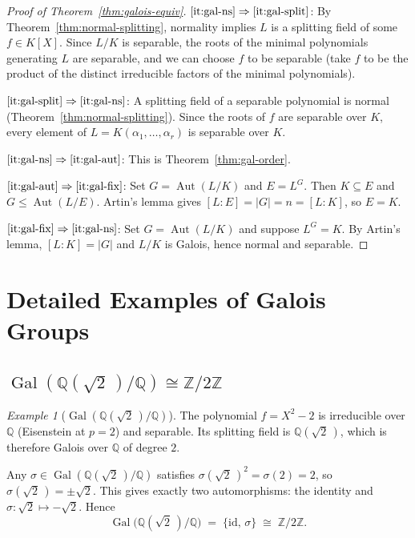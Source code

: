\documentclass[12pt,a4paper,openany]{book}
\theoremstyle{definition}
\theoremstyle{remark}
\newtheorem{example}{Example}[chapter]
\newcommand{\Z}{\mathbb{Z}}
\newcommand{\Q}{\mathbb{Q}}
\DeclareMathOperator{\Gal}{Gal}
\DeclareMathOperator{\Aut}{Aut}
\begin{document}
\begin{proof}[Proof of Theorem~\ref{thm:galois-equiv}]
$\ref{it:gal-ns}\Rightarrow\ref{it:gal-split}$:
By Theorem~\ref{thm:normal-splitting}, normality implies $L$ is a splitting
field of some $f\in K[X]$.  Since $L/K$ is separable, the roots of the
minimal polynomials generating $L$ are separable, and we can choose $f$
to be separable (take $f$ to be the product of the distinct irreducible
factors of the minimal polynomials).

$\ref{it:gal-split}\Rightarrow\ref{it:gal-ns}$:
A splitting field of a separable polynomial is normal
(Theorem~\ref{thm:normal-splitting}).  Since the roots of $f$ are separable
over $K$, every element of $L=K(\alpha_{1},\dots,\alpha_{r})$ is separable
over $K$.

$\ref{it:gal-ns}\Rightarrow\ref{it:gal-aut}$:
This is Theorem~\ref{thm:gal-order}.

$\ref{it:gal-aut}\Rightarrow\ref{it:gal-fix}$:
Set $G=\Aut(L/K)$ and $E=L^{G}$.  Then $K\subseteq E$ and
$G\leq\Aut(L/E)$.  Artin's lemma gives $[L:E]=|G|=n=[L:K]$, so $E=K$.

$\ref{it:gal-fix}\Rightarrow\ref{it:gal-ns}$:
Set $G=\Aut(L/K)$ and suppose $L^{G}=K$.  By Artin's lemma, $[L:K]=|G|$
and $L/K$ is Galois, hence normal and separable.
\end{proof}

\section{Detailed Examples of Galois Groups}
\label{sec:galois-examples}

\subsection{$\Gal(\Q(\sqrt{2}\,)/\Q)\cong\Z/2\Z$}
\label{subsec:ex-sqrt2}

\begin{example}[$\Gal(\Q(\sqrt{2}\,)/\Q)$]\label{ex:gal-sqrt2}
\index{Galois group!of $\Q(\sqrt{2}\,)/\Q$}
The polynomial $f=X^{2}-2$ is irreducible over $\Q$ (Eisenstein at $p=2$)
and separable.  Its splitting field is $\Q(\sqrt{2}\,)$, which is therefore
Galois over $\Q$ of degree $2$.

Any $\sigma\in\Gal(\Q(\sqrt{2}\,)/\Q)$ satisfies $\sigma(\sqrt{2}\,)^{2}=
\sigma(2)=2$, so $\sigma(\sqrt{2}\,)=\pm\sqrt{2}$.  This gives exactly
two automorphisms: the identity and $\sigma\colon\sqrt{2}\mapsto -\sqrt{2}$.
Hence
\[
  \Gal\!\bigl(\Q(\sqrt{2}\,)/\Q\bigr)
  \;=\;\{\mathrm{id},\,\sigma\}
  \;\cong\;\Z/2\Z.
\]
\end{example}
\end{document}

